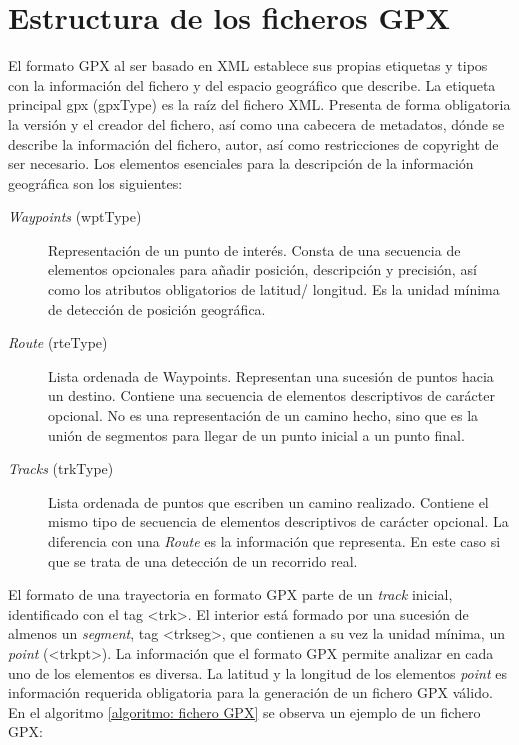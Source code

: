 \section{Estructura de los ficheros \ac{GPX}}
El formato \ac{GPX} al ser basado en \ac{XML} establece sus propias etiquetas y tipos con la información 
del fichero y del espacio geográfico que describe. La etiqueta principal gpx (gpxType) es la raíz del 
fichero \ac{XML}. Presenta de forma obligatoria la versión y el creador del fichero, así como una cabecera 
de metadatos, dónde se describe la información del fichero, autor, así como restricciones de copyright 
de ser necesario. Los elementos esenciales para la descripción de la información geográfica son los 
siguientes:
\begin{description}
\item[\textit{Waypoints} (wptType)] Representación de un punto de interés. Consta de una secuencia de 
elementos 
opcionales para añadir posición, descripción y precisión, así como los atributos obligatorios de latitud/
longitud. Es la unidad mínima de detección de posición geográfica.

\item[\textit{Route} (rteType)] Lista ordenada de Waypoints.  Representan una sucesión de puntos hacia un 
destino. Contiene una secuencia de elementos descriptivos de carácter opcional. No es una representación
de un camino hecho, sino que es la unión de segmentos para llegar de un punto inicial a un punto final. 

\item[\textit{Tracks} (trkType)] Lista ordenada de puntos que escriben un camino realizado. Contiene el 
mismo tipo de secuencia de elementos descriptivos de carácter opcional. La diferencia con una \textit{Route}
es la información que representa. En este caso si que se trata de una detección de un recorrido real.
\end{description}

El formato de una trayectoria en formato \ac{GPX} parte de un \textit{track} inicial, identificado con el tag 
<trk>. El interior está formado por una sucesión de almenos un \textit{segment}, tag <trkseg>, que contienen 
a su vez la unidad mínima, un \textit{point} (<trkpt>). La información que el formato \ac{GPX} permite analizar 
en cada uno de los elementos es diversa. La latitud y la longitud de los elementos \textit{point} es información 
requerida obligatoria para la generación de un fichero \ac{GPX} válido. 
En el algoritmo \ref{algoritmo: fichero GPX} se observa un ejemplo de un fichero \ac{GPX}:

